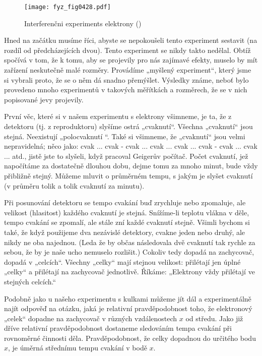     \begin{figure}[ht!] %
      \centering
      \texttt{[image: fyz\_fig0428.pdf]}
      \caption{Interferenčni experiments elektrony
              (\cite[s.~697]{Feynman01})}
      \label{fyz:fig0428}
    \end{figure}

    Hned na začátku musíme říci, abyste se nepokoušeli tento experiment sestavit (na rozdíl od
    předcházejících dvou). Tento experiment se nikdy takto nedělal. Obtíž spočívá v tom, že k tomu,
    aby se projevily pro nás zajímavé efekty, muselo by mít zařízení neskutečně malé rozměry.
    Provádíme „myšlený experiment“, který jsme si vybrali proto, že se o něm dá snadno přemýšlet.
    Výsledky známe, neboť bylo provedeno mnoho experimentů v takových měřítkách a rozměrech, že se v
    nich popisované jevy projevily.
    
    První věc, které si v našem experimentu s elektrony všimneme, je ta, že z detektoru (tj. z
    reproduktoru) slyšíme ostrá „cvaknutí“. Všechna „cvaknutí“ jsou stejná. Neexistují „polocvaknutí
    “. Také si všimneme, že „cvaknutí“ jsou velmi nepravidelná; něco jako: cvak ... cvak - cvak ...
    cvak ... cvak ... cvak - cvak ... cvak ... atd., jistě jste to slyšeli, když pracoval Geigerův
    počítač. Počet cvaknutí, jež napočítáme za dostatečně dlouhou dobu, dejme tomu za mnoho minut,
    bude vždy přibližně stejný. Můžeme mluvit o průměrném tempu, s jakým je slyšet cvaknutí (v
    průměru tolik a tolik cvaknutí za minutu).

    Při posunování detektoru se tempo cvakání buď zrychluje nebo zpomaluje, ale velikost (hlasitost)
    každého cvaknutí je stejná. Snížíme-li teplotu vlákna v děle, tempo cvakání se zpomalí, ale
    stále zní každé cvaknutí stejně. Všimli bychom si také, že když použijeme dva nezávislé
    detektory, cvakne jeden nebo druhý, ale nikdy ne oba najednou. (Leda že by občas následovala dvě
    cvaknutí tak rychle za sebou, že by je naše ucho nemuselo rozlišit.) Cokoliv tedy dopadá na
    zachycovač, dopadá v „celcích“. Všechny „celky“ mají stejnou velikost: přilétají jen úplné
    „celky“ a přilétají na zachycovač jednotlivě. Říkáme: „Elektrony vždy přilétají ve stejných
    celcích.“ 
    
    Podobně jako u našeho experimentu s kulkami můžeme jít dál a experimentálně najít odpověď na
    otázku, jaká je relativní pravděpodobnost toho, že elektronový „celek“ dopadne na zachycovač v
    různých vzdálenostech \(x\) od středu. Jako již dříve relativní pravděpodobnost dostaneme
    sledováním tempa cvakání při rovnoměrné činnosti děla. Pravděpodobnost, že celky dopadnou do
    určitého bodu \(x\), je úměrná střednímu tempu cvakání v bodě \(x\).
    
